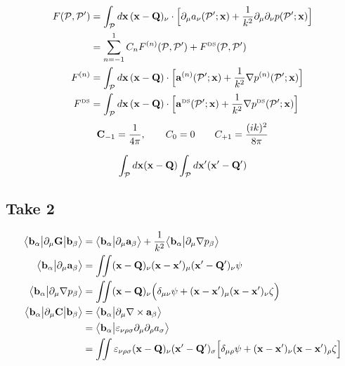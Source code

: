 \documentclass[letterpaper]{article}
\begin{document}
\begin{align*}
 F(\mathcal{P}, \mathcal{P}^\prime)
&=\int_{\mathcal{P}} d\mathbf{x} \, (\mathbf{x}-\mathbf{Q})_\nu
  \cdot \Big[   \partial_\mu a_\nu(\mathcal{P}^\prime; \mathbf{x})
              + \frac{1}{k^2}\partial_\mu \partial_\nu p(\mathcal{P}^\prime; \mathbf{x})
        \Big]
\\
&= \sum_{n=-1}^{1} 
   C_n F^{(n)}(\mathcal{P}, \mathcal{P}^\prime) 
   + F^{\hbox{\tiny{DS}}}(\mathcal{P}, \mathcal{P}^\prime)
\\
F^{(n)}
&=
   \int_{\mathcal{P}} d\mathbf{x} \, (\mathbf{x}-\mathbf{Q})
   \cdot \Big[   \mathbf{a}^{(n)}(\mathcal{P}^\prime; \mathbf{x}) 
              + \frac{1}{k^2}\nabla p^{(n)}(\mathcal{P}^\prime; \mathbf{x})
        \Big]
\\ 
F^{\hbox{\tiny{DS}}}
&= \int_{\mathcal{P}} d\mathbf{x} \, (\mathbf{x}-\mathbf{Q})
   \cdot \Big[   \mathbf{a}^{\hbox{\tiny{DS}}}(\mathcal{P}^\prime; \mathbf{x}) 
              + \frac{1}{k^2}\nabla p^{\hbox{\tiny{DS}}}(\mathcal{P}^\prime; \mathbf{x})
        \Big]
\end{align*}
$$ \mathbf{C}_{-1} = \frac{1}{4\pi}, 
   \qquad 
   C_0=0
   \qquad C_{+1}=\frac{(ik)^2}{8\pi}
$$

\begin{align*}
 \int_{\mathcal{P}} d\mathbf{x} (\mathbf{x}-\mathbf{Q})
 \int_{\mathcal{P}} d\mathbf{x}^\prime (\mathbf{x}^\prime-\mathbf{Q}^\prime)
\end{align*}

\subsection*{Take 2}

\begin{align*}
 \big\langle \mathbf{b}_\alpha \big| \partial_\mu \mathbf{G} \big| \mathbf{b}_\beta \big\rangle
&= \big\langle \mathbf{b}_\alpha \big| \partial_\mu \mathbf{a}_\beta \big\rangle
  +\frac{1}{k^2}
   \big\langle \mathbf{b}_\alpha \big| \partial_\mu \nabla p_\beta \big\rangle
\\
\big\langle \mathbf{b}_\alpha \big| \partial_\mu \mathbf{a}_\beta \big\rangle
&=
 \iint (\mathbf{x}-\mathbf{Q})_\nu (\mathbf{x}-\mathbf{x}^\prime)_\mu 
       (\mathbf{x}^\prime-\mathbf{Q}^\prime)_\nu \psi
\\
\big\langle \mathbf{b}_\alpha \big| \partial_\mu \nabla p_\beta \big\rangle
&=
 \iint (\mathbf{x}-\mathbf{Q})_\nu 
       \Big( \delta_{\mu\nu} \psi
             +(\mathbf{x}-\mathbf{x}^\prime)_\mu
              (\mathbf{x}-\mathbf{x}^\prime)_\nu \zeta
       \Big)
\\
 \big\langle \mathbf{b}_\alpha \big| \partial_\mu \mathbf{C} \big| \mathbf{b}_\beta \big\rangle
&= \big\langle \mathbf{b}_\alpha \big| \partial_\mu \nabla \times \mathbf{a}_\beta \big\rangle
\\
&= \big\langle \mathbf{b}_\alpha \big| \varepsilon_{\nu \rho \sigma}
                      \partial_\mu \partial_\rho a_\sigma \big\rangle
\\
&= \iint \varepsilon_{\nu\rho\sigma}
         (\mathbf{x} - \mathbf{Q})_\nu (\mathbf{x}^\prime-\mathbf{Q}^\prime)_\sigma
         \Big[ \delta_{\mu\rho} \psi + 
               (\mathbf{x} - \mathbf{x}^\prime)_\nu
               (\mathbf{x} - \mathbf{x}^\prime)_\rho \zeta
         \Big]
\end{align*}
\end{document}
